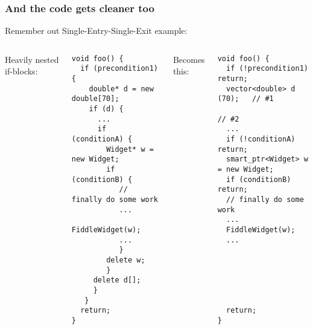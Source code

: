 \begin{frame}[fragile,t]
\frametitle{And the code gets cleaner too}
Remember out Single-Entry-Single-Exit example:

\begin{columns}[t]
Heavily nested if-blocks:
{\scriptsize\begin{verbatim}
void foo() {
  if (precondition1) {
    double* d = new double[70];
    if (d) {
      ...
      if (conditionA) {
        Widget* w = new Widget;
        if (conditionB) {
           // finally do some work
           ...
           FiddleWidget(w);
           ...
           }
        delete w;
        }
     delete d[];
     }
   }
  return;
}
\end{verbatim}}
\pause{}
Becomes this:
{\scriptsize\begin{verbatim}
void foo() {
  if (!precondition1)  return;
  vector<double> d (70);   // #1
                           // #2
  ...
  if (!conditionA) return;
  smart_ptr<Widget> w = new Widget;
  if (conditionB) return;
  // finally do some work
  ...
  FiddleWidget(w);
  ...






  return;
}
\end{verbatim}}
\end{columns}
\pause{}
\end{frame}
